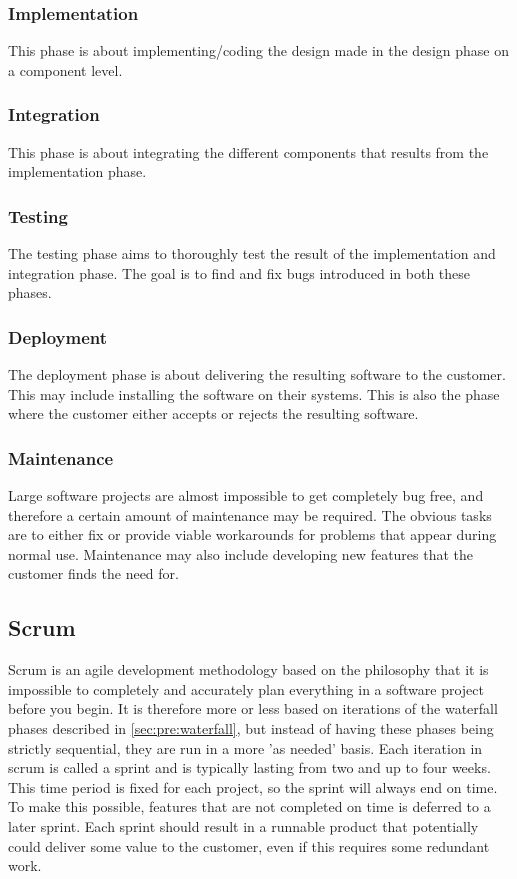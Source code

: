 \subsubsection{Implementation}
This phase is about implementing/coding the design made in the design phase on
a component level.

\subsubsection{Integration}
This phase is about integrating the different components that results from the
implementation phase.

\subsubsection{Testing}
The testing phase aims to thoroughly test the result of the implementation and
integration phase. The goal is to find and fix bugs introduced in both these
phases.

\subsubsection{Deployment}
The deployment phase is about delivering the resulting software to the
customer. This may include installing the software on their systems. This is
also the phase where the customer either accepts or rejects the resulting
software.

\subsubsection{Maintenance}
Large software projects are almost impossible to get completely bug free, and
therefore a certain amount of maintenance may be required. The obvious tasks
are to either fix or provide viable workarounds for problems that appear during
normal use. Maintenance may also include developing new features that the
customer finds the need for.

\subsection{Scrum}
Scrum is an agile development methodology based on the philosophy that it is
impossible to completely and accurately plan everything in a software project
before you begin. It is therefore more or less based on iterations of the
waterfall phases described in \autoref{sec:pre:waterfall}, but instead of
having these phases being strictly sequential, they are run in a more
'as needed' basis. Each iteration in scrum is called a sprint and is typically
lasting from two and up to four weeks. This time period is fixed for each
project, so the sprint will always end on time. To make this possible, features
that are not completed on time is deferred to a later sprint. Each sprint
should result in a runnable product that potentially could deliver some value
to the customer, even if this requires some redundant work.

